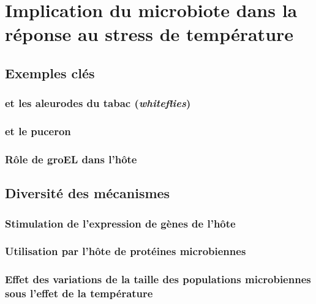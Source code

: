 \chapter{Implication du microbiote dans la réponse au stress de température} %
\label{sec:implicationµbiote}
	
	\section{Exemples clés} %
	\label{sec:exemples}
		

		\subsection{ et les aleurodes du tabac (\textit{whiteflies})} %
		\label{sub:rickettsia_et_les_aleurodes}
			

		\subsection{ et le puceron } %
		\label{sub:exemple_buchnera}
			

		\subsection{Rôle de groEL dans l'hôte } %
		\label{sub:groel}
			

	\section{Diversité des mécanismes} %
	\label{sec:diversit_des_m_canismes}
		

		\subsection{Stimulation de l'expression de gènes de l'hôte} %
		\label{sub:gènes_hôte}
			

		\subsection{Utilisation par l'hôte de protéines microbiennes} %
		\label{sub:gènes_microbiens}
			

		\subsection{Effet des variations de la taille des populations microbiennes sous l'effet de la température} %
		\label{sub:pop_bact}
			
